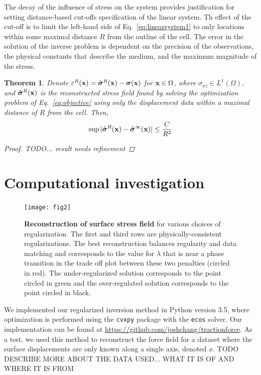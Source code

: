 \documentclass[aps,prl,reprint,twocolumn,groupedaddress,showpacs]{revtex4-1}
\newtheorem{thm}{Theorem}%
\newcommand{\bsigma}{{\boldsymbol\sigma}}
\def\x{{\bf x}}
\begin{document}
The decay of the influence of stress on the system provides justification for setting distance-based
cut-offs specification of the linear system. Th effect of the cut-off is to limit the left-hand side of Eq.~\ref{eq:linearsystem1} to only locations within some maximal distance $R$ from the outline of the cell.
The error in the solution of the inverse problem is dependent on the precision of the observations,
 the physical constants that describe the medium, and the maximum magnitude of the stress.

\begin{thm}
\label{thm:main}
Denote $\varepsilon^R(\x) = \hat{\bsigma}^R(\x) - \bsigma(\x)$ for $\x\in\Omega$, where $\sigma_{xz}\in L^1(\Omega)$, and $\hat{\bsigma}^R(\x)$ is the reconstructed stress field found by solving the optimization problem of Eq.~\ref{eq:objective} using only the displacement data within a maximal distance of $R$ from the cell. Then,
\begin{equation}
\sup \vert \hat{\bsigma}^R(\x) - \hat{\bsigma}^\infty(\x) \vert \leq \frac{C}{R^2}
\end{equation}

\begin{proof}
TODO... result needs refinement

\end{proof}

\end{thm}


\section{Computational investigation}

\begin{figure}
\texttt{[image: fig2]}
\caption{\textbf{Reconstruction of surface stress field} for various choices of regularization. The first and third rows are physically-consistent regularizations. The best reconstruction balances regularity and data matching and corresponds to the value for $\lambda$ that is near a phase transition in the trade off plot between these two penalties (circled in red). The under-regularized solution corresponds to the point circled in green and the over-regulated solution corresponds to the point circled in black.}
\label{fig:fig2}
\end{figure}

We implemented our regularized inversion method in Python version 3.5, where optimization is performed using the \texttt{cvxpy} package with the \texttt{ecos} solver.  Our implementation can be found at \url{https://github.com/joshchang/tractionforce}. As a test, we used this method to reconstruct the force field for a dataset where the surface displacements are only known along a single axis, denoted $x$. TODO DESCRIBE MORE ABOUT THE DATA USED... WHAT IT IS OF AND WHERE IT IS FROM
\end{document}
